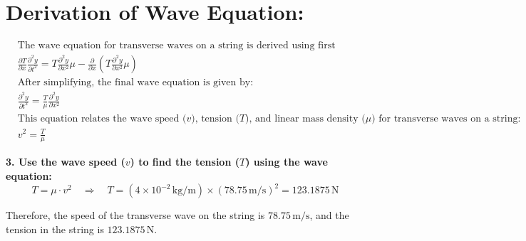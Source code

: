 \documentclass[journal,12pt,twocolumn]{IEEEtran}
\begin{document}
\section*{Derivation of Wave Equation:}
\begin{align}\label{eq:waveequation}
    &\text{The wave equation for transverse waves on a string is derived using first principles. Starting with the tension-force relationship and applying Newton's second law, we obtain the differential equation:} \nonumber \\
    &\frac{\partial T}{\partial x} \frac{\partial^2 y}{\partial t^2} = T \frac{\partial^2 y}{\partial x^2} \mu - \frac{\partial}{\partial x}(T \frac{\partial^2 y}{\partial x^2} \mu) \nonumber \\
    &\text{After simplifying, the final wave equation is given by:} \nonumber \\
    &\frac{\partial^2 y}{\partial t^2} = \frac{T}{\mu} \frac{\partial^2 y}{\partial x^2} \nonumber \\ 
    &\text{This equation relates the wave speed (\(v\)), tension (\(T\)), and linear mass density (\(\mu\)) for transverse waves on a string:} \nonumber \\  
    &v^2 = \frac{T}{\mu}
\end{align}

\textbf{3. Use the wave speed (\(v\)) to find the tension (\(T\)) using the wave equation:}
\begin{equation}\label{eq:tension}
    T = \mu \cdot v^2 \quad \Rightarrow \quad T = (4 \times 10^{-2} \, \text{kg/m}) \times (78.75 \, \text{m/s})^2 = 123.1875 \, \text{N}
\end{equation}

Therefore, the speed of the transverse wave on the string is $78.75 \, \text{m/s}$, and the tension in the string is $123.1875 \, \text{N}$.
\end{document}
